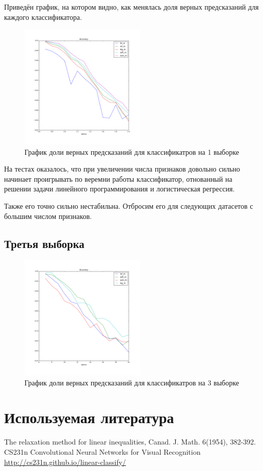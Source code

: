 \documentclass[a4paper]{article}
\begin{document}
Приведён график, на котором видно, как менялась доля верных предсказаний для каждого классификатора.


\begin{figure}[ht]
\centering
\includegraphics[width=6cm]{first_dataset}
\caption{График доли верных предсказаний для классификатров на 1 выборке}
\end{figure}

На тестах оказалось, что при увеличении числа признаков довольно сильно начинает проигрывать по веремни работы классификатор, отнованный на решении задачи линейного программирования и логистическая регрессия.

Также его точно сильно нестабильна. Отбросим его для следующих датасетов с большим числом признаков.

\subsection{Третья выборка}

\begin{figure}[ht]
\centering
\includegraphics[width=6cm]{third_dataset}
\caption{График доли верных предсказаний для классификатров на 3 выборке}
\end{figure}

\newpage
\section{Используемая литература}
\begin{thebibliography}{99}
 The relaxation method for linear inequalities, Canad. J. Math. 6(1954), 382-392.
 CS231n Convolutional Neural Networks for Visual Recognition \url{http://cs231n.github.io/linear-classify/}
\end{thebibliography}
\end{document}
